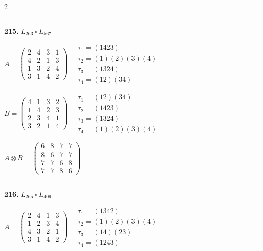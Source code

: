 \begin{multicols}{2}
\vspace{0.3em}
\hrule
\vspace{0.3em}

\noindent\textbf{215.} $L_{263} \circ L_{567}$

$A = \begin{pmatrix} 2 & 4 & 3 & 1 \\ 4 & 2 & 1 & 3 \\ 1 & 3 & 2 & 4 \\ 3 & 1 & 4 & 2 \end{pmatrix} \quad \begin{matrix} \tau_{1}=(1 4 2 3) \\ \tau_{2}=(1)(2)(3)(4) \\ \tau_{3}=(1 3 2 4) \\ \tau_{4}=(1 2)(3 4) \end{matrix}$

$B = \begin{pmatrix} 4 & 1 & 3 & 2 \\ 1 & 4 & 2 & 3 \\ 2 & 3 & 4 & 1 \\ 3 & 2 & 1 & 4 \end{pmatrix} \quad \begin{matrix} \tau_{1}=(1 2)(3 4) \\ \tau_{2}=(1 4 2 3) \\ \tau_{3}=(1 3 2 4) \\ \tau_{4}=(1)(2)(3)(4) \end{matrix}$

$A \otimes B = \begin{pmatrix} 6 & 8 & 7 & 7 \\ 8 & 6 & 7 & 7 \\ 7 & 7 & 6 & 8 \\ 7 & 7 & 8 & 6 \end{pmatrix}$

\vspace{0.3em}
\hrule
\vspace{0.3em}

\noindent\textbf{216.} $L_{265} \circ L_{409}$

$A = \begin{pmatrix} 2 & 4 & 1 & 3 \\ 1 & 2 & 3 & 4 \\ 4 & 3 & 2 & 1 \\ 3 & 1 & 4 & 2 \end{pmatrix} \quad \begin{matrix} \tau_{1}=(1 3 4 2) \\ \tau_{2}=(1)(2)(3)(4) \\ \tau_{3}=(1 4)(2 3) \\ \tau_{4}=(1 2 4 3) \end{matrix}$


\end{multicols}
